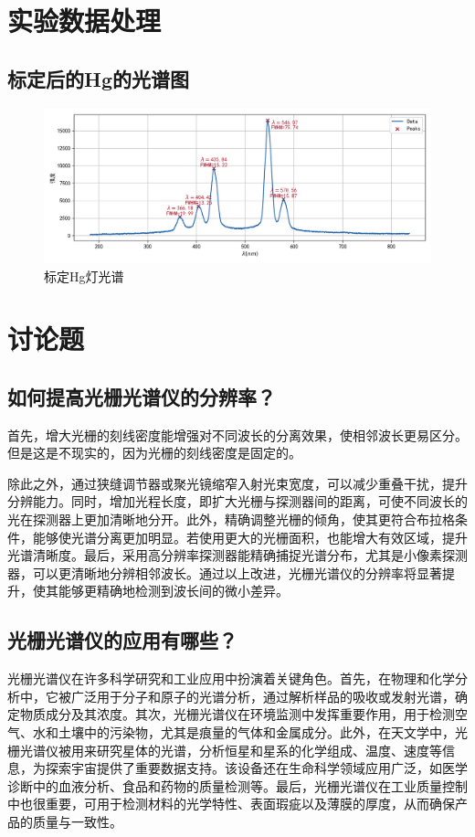 \documentclass{ctexart}
\begin{document}
\newpage

\section{实验数据处理}

\subsection{标定后的Hg的光谱图}

\begin{figure}[!htbp]
    \centering
    \caption{标定Hg灯光谱}
    \includegraphics[width=\textwidth]{result.png}
\end{figure}

\section{讨论题}

\subsection{如何提高光栅光谱仪的分辨率？}

首先，增大光栅的刻线密度能增强对不同波长的分离效果，使相邻波长更易区分。但是这是不现实的，因为光栅的刻线密度是固定的。

除此之外，通过狭缝调节器或聚光镜缩窄入射光束宽度，可以减少重叠干扰，提升分辨能力。同时，增加光程长度，即扩大光栅与探测器间的距离，可使不同波长的光在探测器上更加清晰地分开。此外，精确调整光栅的倾角，使其更符合布拉格条件，能够使光谱分离更加明显。若使用更大的光栅面积，也能增大有效区域，提升光谱清晰度。最后，采用高分辨率探测器能精确捕捉光谱分布，尤其是小像素探测器，可以更清晰地分辨相邻波长。通过以上改进，光栅光谱仪的分辨率将显著提升，使其能够更精确地检测到波长间的微小差异。

\subsection{光栅光谱仪的应用有哪些？}

光栅光谱仪在许多科学研究和工业应用中扮演着关键角色。首先，在物理和化学分析中，它被广泛用于分子和原子的光谱分析，通过解析样品的吸收或发射光谱，确定物质成分及其浓度。其次，光栅光谱仪在环境监测中发挥重要作用，用于检测空气、水和土壤中的污染物，尤其是痕量的气体和金属成分。此外，在天文学中，光栅光谱仪被用来研究星体的光谱，分析恒星和星系的化学组成、温度、速度等信息，为探索宇宙提供了重要数据支持。该设备还在生命科学领域应用广泛，如医学诊断中的血液分析、食品和药物的质量检测等。最后，光栅光谱仪在工业质量控制中也很重要，可用于检测材料的光学特性、表面瑕疵以及薄膜的厚度，从而确保产品的质量与一致性。
\end{document}
